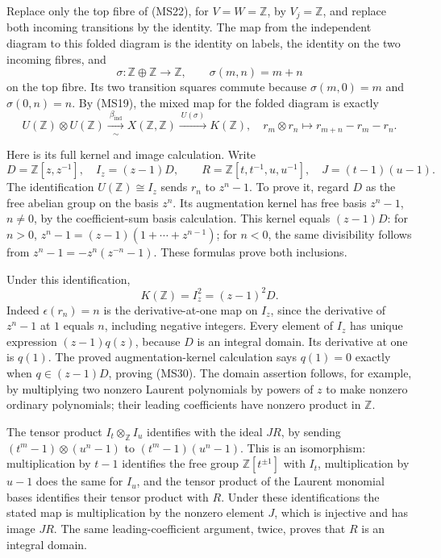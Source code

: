 \documentclass[
]{article}
\begin{document}
Replace only the top fibre of (MS22), for \(V=W=\mathbb Z\), by
\(V_j=\mathbb Z\), and replace both incoming transitions by the
identity. The map from the independent diagram to this folded diagram is
the identity on labels, the identity on the two incoming fibres, and \[
\sigma:\mathbb Z\oplus\mathbb Z\to\mathbb Z,
\qquad \sigma(m,n)=m+n
\tag{MS27}
\] on the top fibre. Its two transition squares commute because
\(\sigma(m,0)=m\) and \(\sigma(0,n)=n\). By (MS19), the mixed map for
the folded diagram is exactly \[
U(\mathbb Z)\otimes U(\mathbb Z)
\xrightarrow[\sim]{\ \beta_{\mathrm{ind}}\ }X(\mathbb Z,\mathbb Z)
\xrightarrow{\ U(\sigma)\ }K(\mathbb Z),
\quad
r_m\otimes r_n\longmapsto r_{m+n}-r_m-r_n.
\tag{MS28}
\]

Here is its full kernel and image calculation. Write \[
D=\mathbb Z[z,z^{-1}],\quad I_z=(z-1)D,
\qquad R=\mathbb Z[t,t^{-1},u,u^{-1}],\quad J=(t-1)(u-1).
\tag{MS29}
\] The identification \(U(\mathbb Z)\cong I_z\) sends \(r_n\) to
\(z^n-1\). To prove it, regard \(D\) as the free abelian group on the
basis \(z^n\). Its augmentation kernel has free basis \(z^n-1\),
\(n\ne0\), by the coefficient-sum basis calculation. This kernel equals
\((z-1)D\): for \(n>0\), \(z^n-1=(z-1)(1+\cdots+z^{n-1})\); for \(n<0\),
the same divisibility follows from \(z^n-1=-z^n(z^{-n}-1)\). These
formulas prove both inclusions.

Under this identification, \[
K(\mathbb Z)=I_z^2=(z-1)^2D.
\tag{MS30}
\] Indeed \(\epsilon(r_n)=n\) is the derivative-at-one map on \(I_z\),
since the derivative of \(z^n-1\) at \(1\) equals \(n\), including
negative integers. Every element of \(I_z\) has unique expression
\((z-1)q(z)\), because \(D\) is an integral domain. Its derivative at
one is \(q(1)\). The proved augmentation-kernel calculation says
\(q(1)=0\) exactly when \(q\in(z-1)D\), proving (MS30). The domain
assertion follows, for example, by multiplying two nonzero Laurent
polynomials by powers of \(z\) to make nonzero ordinary polynomials;
their leading coefficients have nonzero product in \(\mathbb Z\).

The tensor product \(I_t\otimes_{\mathbb Z}I_u\) identifies with the
ideal \(JR\), by sending \((t^m-1)\otimes(u^n-1)\) to
\((t^m-1)(u^n-1)\). This is an isomorphism: multiplication by \(t-1\)
identifies the free group \(\mathbb Z[t^{\pm1}]\) with \(I_t\),
multiplication by \(u-1\) does the same for \(I_u\), and the tensor
product of the Laurent monomial bases identifies their tensor product
with \(R\). Under these identifications the stated map is multiplication
by the nonzero element \(J\), which is injective and has image \(JR\).
The same leading-coefficient argument, twice, proves that \(R\) is an
integral domain.
\end{document}
